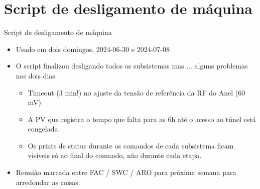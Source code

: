 \section{Script de desligamento de máquina}



\begin{frame}{Script de desligamento de máquina}
\begin{itemize}
    \setlength\itemsep{1em}
    \item Usado em dois domingos, 2024-06-30 e 2024-07-08
    \item O script finalizou desligando todos os subsistemas mas ... alguns problemas nos dois dias
        \begin{itemize}
            \setlength\itemsep{1em}
            \item Timeout (3 min!) no ajuste da tensão de referência da RF do Anel (60 mV)
            \item A PV que registra o tempo que falta para as 6h até o acesso ao túnel está congelada.
            \item Os prints de status durante os comandos de cada subsistema ficam visíveis só ao final do comando, não durante cada etapa.
        \end{itemize}
    \item Reunião marcada entre FAC / SWC / ARO para próxima semana para arredondar as coisas.
\end{itemize}
\end{frame}
